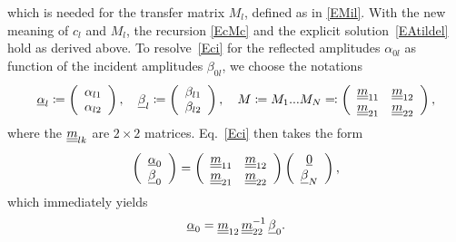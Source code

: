 which is needed for the transfer matrix $M_l$,
defined as in \cref{EMil}.
With the new meaning of $c_l$ and $M_l$,
the recursion \cref{EcMc} and the explicit solution~\cref{EAtildel}
hold as derived above.
To resolve~\cref{Eci} for the reflected amplitudes $\alpha_{0l}$
as function of the incident amplitudes $\beta_{0l}$,
we choose the notations
\begin{equation}
  \u\alpha_l
  \coloneqq \left(\begin{array}{c}\alpha_{l1}\\\alpha_{l2}\end{array}\right),\quad
  \u\beta_l
  \coloneqq \left(\begin{array}{c}\beta_{l1}\\\beta_{l2}\end{array}\right),\quad
  M\coloneqq M_1 ... M_N %
  \eqqcolon \left(\begin{array}{cc}\uu m_{11}&\uu m_{12}\\
                           \uu m_{21}&\uu m_{22}\end{array}\right),
\end{equation}
where the $\underline{\underline{m}}_{l k}$ are $2\times2$ matrices.
Eq.~\cref{Eci} then takes the form
\begin{equation}
  \left(\begin{array}{c}\underline{\alpha}_{0}\\\underline{\beta}_{0}\end{array}\right)
  =
  \left(\begin{array}{cc}\underline{\underline{m}}_{11}&\underline{\underline{m}}_{12}\\
    \underline{\underline{m}}_{21}&\underline{\underline{m}}_{22}\end{array}\right)
  \left(\begin{array}{c}\underline{0}\\\underline{\beta}_{N}\end{array}\right),
\end{equation}
which immediately yields
\begin{equation}
  \underline{\alpha}_0 = \underline{\underline{m}}_{12}\,\underline{\underline{m}}_{22}^{-1}\,\underline{\beta}_0.
\end{equation}
\fi
